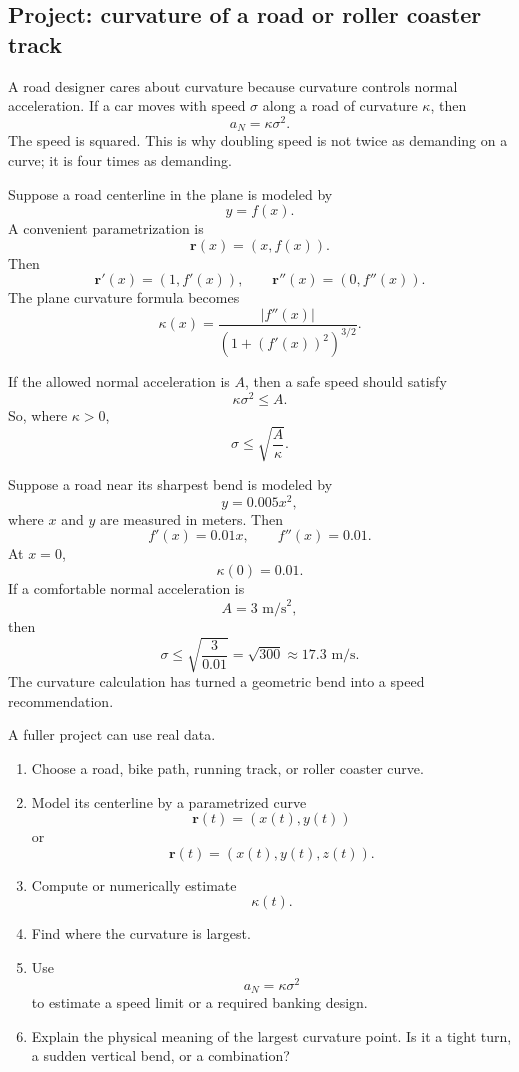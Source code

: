 \subsection{Project: curvature of a road or roller coaster track}

A road designer cares about curvature because curvature controls normal acceleration.
If a car moves with speed \(\sigma\) along a road of curvature \(\kappa\), then
\[
    a_N=\kappa\sigma^2.
\]
The speed is squared.  This is why doubling speed is not twice as demanding on a
curve; it is four times as demanding.

Suppose a road centerline in the plane is modeled by
\[
    y=f(x).
\]
A convenient parametrization is
\[
    \mathbf r(x)=(x,f(x)).
\]
Then
\[
    \mathbf r'(x)=(1,f'(x)),
\qquad
    \mathbf r''(x)=(0,f''(x)).
\]
The plane curvature formula becomes
\[
\boxed{
    \kappa(x)=
    \frac{|f''(x)|}{\left(1+(f'(x))^2\right)^{3/2}}.
}
\]

If the allowed normal acceleration is \(A\), then a safe speed should satisfy
\[
    \kappa\sigma^2\le A.
\]
So, where \(\kappa>0\),
\[
\boxed{
    \sigma\le \sqrt{\frac{A}{\kappa}}.
}
\]

\begin{example}
Suppose a road near its sharpest bend is modeled by
\[
    y=0.005x^2,
\]
where \(x\) and \(y\) are measured in meters.  Then
\[
    f'(x)=0.01x,
    \qquad
    f''(x)=0.01.
\]
At \(x=0\),
\[
    \kappa(0)=0.01.
\]
If a comfortable normal acceleration is
\[
    A=3\text{ m/s}^2,
\]
then
\[
    \sigma\le \sqrt{\frac{3}{0.01}}=\sqrt{300}\approx17.3\text{ m/s}.
\]
The curvature calculation has turned a geometric bend into a speed recommendation.
\end{example}

A fuller project can use real data.

\begin{enumerate}
\item Choose a road, bike path, running track, or roller coaster curve.

\item Model its centerline by a parametrized curve
\[
    \mathbf r(t)=(x(t),y(t))
\]
or
\[
    \mathbf r(t)=(x(t),y(t),z(t)).
\]

\item Compute or numerically estimate
\[
    \kappa(t).
\]

\item Find where the curvature is largest.

\item Use
\[
    a_N=\kappa\sigma^2
\]
to estimate a speed limit or a required banking design.

\item Explain the physical meaning of the largest curvature point.  Is it a tight turn,
a sudden vertical bend, or a combination?
\end{enumerate}

